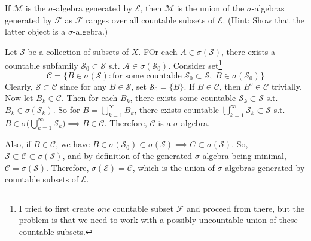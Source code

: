 	\begin{exercise}[Folland 1.5]
		If $\mathcal{M}$ is the $\sigma$-algebra generated by $\mathcal{E}$, then $\mathcal{M}$ is the union of the $\sigma$-algebras generated by $\mathcal{F}$ as $\mathcal{F}$ ranges over all countable subsets of $\mathcal{E}$. (Hint: Show that the latter object is a $\sigma$-algebra.)
	\end{exercise}
	\begin{solution}
		Let $\mathcal{S}$ be a collection of subsets of $X$. FOr each $A \in \sigma(\mathcal{S})$, there exists a countable subfamily $\mathcal{S}_0 \subset \mathcal{S}$ s.t. $\mathcal{A} \in \sigma(\mathcal{S}_0)$. Consider set\footnote{I tried to first create \textit{one} countable subset $\mathcal{F}$ and proceed from there, but the problem is that we need to work with a possibly uncountable union of these countable subsets.} 
		\begin{equation}
			\mathcal{C} = \{B \in \sigma(\mathcal{S}) \colon \text{for some countable } \mathcal{S}_0 \subset \mathcal{S}, \; B \in \sigma(\mathcal{S}_0) \}
		\end{equation}
		Clearly, $\mathcal{S} \subset \mathcal{C}$ since for any $B \in \mathcal{S}$, set $\mathcal{S}_0 = \{B\}$. If $B \in \mathcal{C}$, then $B^c \in \mathcal{C}$ trivially. Now let $B_k \in \mathcal{C}$. Then for each $B_k$, there exists some countable $\mathcal{S}_k \subset \mathcal{S}$ s.t. $B_k \in \sigma(\mathcal{S}_k)$. So for $B = \bigcup_{k=1}^\infty B_k$, there exists countable $\bigcup_{k=1}^\infty \mathcal{S}_k \subset \mathcal{S}$ s.t. $B \in \sigma \big( \bigcup_{k=1}^\infty \mathcal{S}_k \big) \implies B \in \mathcal{C}$. Therefore, $\mathcal{C}$ is a $\sigma$-algebra. 

		Also, if $B \in \mathcal{C}$, we have $B \in \sigma(\mathcal{S}_0) \subset \sigma(\mathcal{S}) \implies C \subset \sigma(\mathcal{S})$. So, $\mathcal{S} \subset \mathcal{C} \subset \sigma(\mathcal{S})$, and by definition of the generated $\sigma$-algebra being minimal, $\mathcal{C} = \sigma(\mathcal{S})$. Therefore, $\sigma(\mathcal{E}) = \mathcal{C}$, which is the union of $\sigma$-algebras generated by countable subsets of $\mathcal{E}$. 
	\end{solution}


